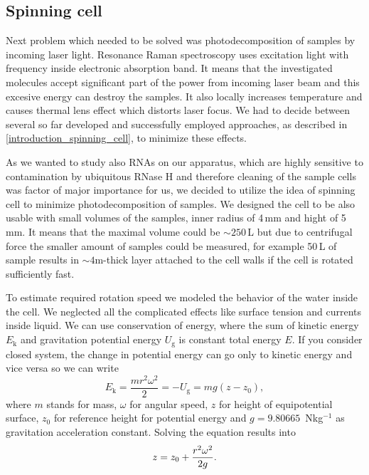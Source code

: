 \subsection{Spinning cell}
\label{spinning_cell}

Next problem which needed to be solved was photodecomposition of samples by
incoming laser light. Resonance Raman spectroscopy uses excitation light
with frequency inside electronic absorption band. It means that the
investigated molecules accept significant part of the power from incoming
laser beam and this excesive energy can destroy the samples. It also locally
increases temperature and causes thermal lens effect which distorts laser
focus. We had to decide between several so far developed and successfully
employed approaches, as described in
\cref{introduction_spinning_cell},
to minimize these effects.

As we wanted to study also RNAs on our apparatus, which are highly sensitive
to contamination by ubiquitous RNase H and therefore cleaning of the sample
cells was factor of major importance for us, we decided to utilize the idea
of spinning cell to minimize photodecomposition of samples. We designed the
cell to be also usable with small volumes of the samples, inner radius of 4\,mm
and hight of 5\,mm. It means that the maximal volume could be $\sim250$\,L
but due to centrifugal force the smaller amount of samples could be measured,
for example 50\,L of sample results in $\sim 4$m-thick layer attached
to the cell walls if the cell is rotated sufficiently fast.

To estimate required rotation speed we modeled the behavior of the water
inside the cell. We neglected all the complicated effects like surface tension
and currents inside liquid. We can use conservation of energy, where the sum
of kinetic energy $E_\text{k}$ and gravitation potential energy $U_\text{g}$ is
constant total energy $E$. If you consider closed system, the change in
potential energy can go only to kinetic energy and vice versa so we can write
\begin{equation*}
	E_\text{k} = \frac{mr^2\omega^2}{2} = -U_\text{g} = mg(z - z_0),
\end{equation*}
where $m$ stands for mass, $\omega$ for angular speed, $z$ for height of
equipotential surface, $z_0$ for reference height for potential energy and
$g = 9.80665$\, Nkg$^{-1}$ as gravitation acceleration constant. Solving the
equation results into
\begin{equation}
	z = z_0 + \frac{r^2\omega^2}{2g}.
	\label{\eqnlabel{spinning_cell:liquid_surface}}
\end{equation}

